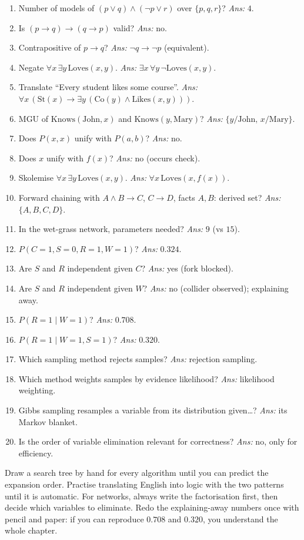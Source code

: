 \documentclass[11pt,a4paper]{article}
\begin{document}
\begin{enumerate}[leftmargin=*,itemsep=4pt]
\item Number of models of $(p\vee q)\wedge(\neg p\vee r)$ over $\{p,q,r\}$? \emph{Ans:} $4$.
\item Is $(p\to q)\to(q\to p)$ valid? \emph{Ans:} no.
\item Contrapositive of $p\to q$? \emph{Ans:} $\neg q\to\neg p$ (equivalent).
\item Negate $\forall x\,\exists y\,\text{Loves}(x,y)$. \emph{Ans:} $\exists x\,\forall y\,\neg\text{Loves}(x,y)$.
\item Translate ``Every student likes some course''. \emph{Ans:} $\forall x\,(\text{St}(x)\to\exists y\,(\text{Co}(y)\wedge\text{Likes}(x,y)))$.
\item MGU of $\text{Knows}(\text{John},x)$ and $\text{Knows}(y,\text{Mary})$? \emph{Ans:} $\{y/\text{John},\,x/\text{Mary}\}$.
\item Does $P(x,x)$ unify with $P(a,b)$? \emph{Ans:} no.
\item Does $x$ unify with $f(x)$? \emph{Ans:} no (occurs check).
\item Skolemise $\forall x\,\exists y\,\text{Loves}(x,y)$. \emph{Ans:} $\forall x\,\text{Loves}(x,f(x))$.
\item Forward chaining with $A\wedge B\to C$, $C\to D$, facts $A,B$: derived set? \emph{Ans:} $\{A,B,C,D\}$.
\item In the wet-grass network, parameters needed? \emph{Ans:} $9$ (vs $15$).
\item $P(C{=}1,S{=}0,R{=}1,W{=}1)$? \emph{Ans:} $0.324$.
\item Are $S$ and $R$ independent given $C$? \emph{Ans:} yes (fork blocked).
\item Are $S$ and $R$ independent given $W$? \emph{Ans:} no (collider observed); explaining away.
\item $P(R{=}1\mid W{=}1)$? \emph{Ans:} $0.708$.
\item $P(R{=}1\mid W{=}1,S{=}1)$? \emph{Ans:} $0.320$.
\item Which sampling method rejects samples? \emph{Ans:} rejection sampling.
\item Which method weights samples by evidence likelihood? \emph{Ans:} likelihood weighting.
\item Gibbs sampling resamples a variable from its distribution given\dots? \emph{Ans:} its Markov blanket.
\item Is the order of variable elimination relevant for correctness? \emph{Ans:} no, only for efficiency.
\end{enumerate}

\vspace{4mm}
\begin{intuition}
Draw a search tree by hand for every algorithm until you can predict the expansion order. Practise translating English into logic with the two patterns until it is automatic. For networks, always write the factorisation first, then decide which variables to eliminate. Redo the explaining-away numbers once with pencil and paper: if you can reproduce $0.708$ and $0.320$, you understand the whole chapter.
\end{intuition}
\end{document}
